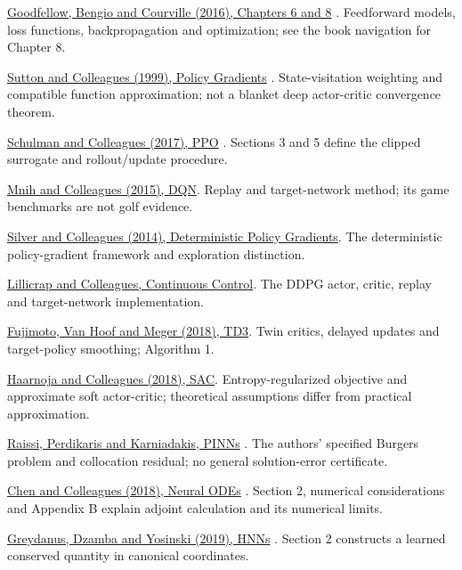 \href{https://www.deeplearningbook.org/contents/mlp.html}{Goodfellow, Bengio and Courville (2016), Chapters 6 and 8} \cite{goodfellow2016}. Feedforward models, loss functions, backpropagation and optimization; see the book navigation for Chapter 8.

\href{https://proceedings.neurips.cc/paper/1999/hash/464d828b85b0bed98e80ade0a5c43b0f-Abstract.html}{Sutton and Colleagues (1999), Policy Gradients} \cite{sutton1999review}. State-visitation weighting and compatible function approximation; not a blanket deep actor-critic convergence theorem.

\href{https://arxiv.org/abs/1707.06347}{Schulman and Colleagues (2017), PPO} \cite{schulman2017}. Sections 3 and 5 define the clipped surrogate and rollout/update procedure.

\href{https://www.nature.com/articles/nature14236}{Mnih and Colleagues (2015), DQN}. Replay and target-network method; its game benchmarks are not golf evidence.

\href{https://proceedings.mlr.press/v32/silver14.html}{Silver and Colleagues (2014), Deterministic Policy Gradients}. The deterministic policy-gradient framework and exploration distinction.

\href{https://arxiv.org/abs/1509.02971}{Lillicrap and Colleagues, Continuous Control}. The DDPG actor, critic, replay and target-network implementation.

\href{https://proceedings.mlr.press/v80/fujimoto18a.html}{Fujimoto, Van Hoof and Meger (2018), TD3}. Twin critics, delayed updates and target-policy smoothing; Algorithm 1.

\href{https://proceedings.mlr.press/v80/haarnoja18b.html}{Haarnoja and Colleagues (2018), SAC}. Entropy-regularized objective and approximate soft actor-critic; theoretical assumptions differ from practical approximation.

\href{https://maziarraissi.github.io/PINNs/}{Raissi, Perdikaris and Karniadakis, PINNs} \cite{raissi2019review}. The authors' specified Burgers problem and collocation residual; no general solution-error certificate.

\href{https://arxiv.org/abs/1806.07366}{Chen and Colleagues (2018), Neural ODEs} \cite{chen2018review}. Section 2, numerical considerations and Appendix B explain adjoint calculation and its numerical limits.

\href{https://arxiv.org/abs/1906.01563}{Greydanus, Dzamba and Yosinski (2019), HNNs} \cite{greydanus2019hamiltonian}. Section 2 constructs a learned conserved quantity in canonical coordinates.

